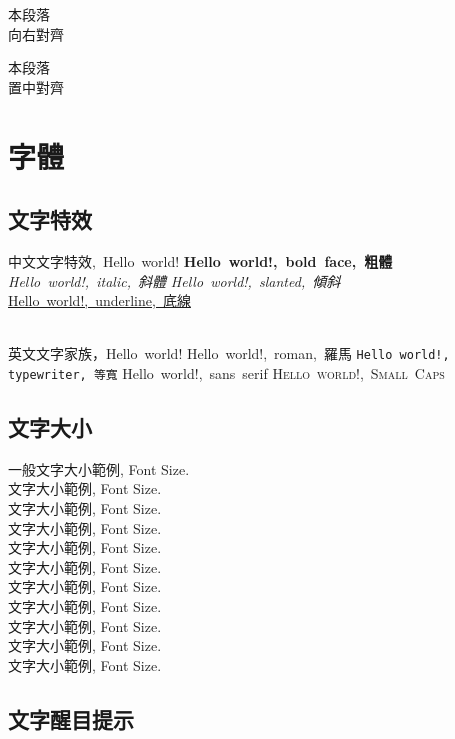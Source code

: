 \begin{flushright}
    本段落\\
    向右對齊
\end{flushright}

\begin{center}
    本段落\\
    置中對齊
\end{center}

\newpage

\section{字體}
\subsection{文字特效}

\hbox{中文文字特效, Hello world!}
{\LARGE
\hbox{\textbf{Hello world!, bold face, 粗體}}
\hbox{\textit{Hello world!, italic, 斜體}}
\hbox{\textsl{Hello world!, slanted, 傾斜}}
\hbox{\underline{Hello world!, underline, 底線}}
}

~\\

\hbox{英文文字家族，Hello world!}
{\LARGE
   \hbox{\textrm{Hello world!, roman, 羅馬}}
   \hbox{\texttt{Hello world!, typewriter, 等寬}}
   \hbox{\textsf{Hello world!, sans serif}}
   \hbox{\textsc{Hello world!, Small Caps}}
}
\clearpage

\subsection{文字大小}
一般文字大小範例, Font Size. \\
{\tiny 文字大小範例, Font Size.} \\
{\scriptsize 文字大小範例, Font Size.} \\
{\footnotesize 文字大小範例, Font Size.} \\
{\small 文字大小範例, Font Size.} \\
{\normalsize 文字大小範例, Font Size.} \\
{\large 文字大小範例, Font Size.} \\
{\Large 文字大小範例, Font Size.} \\
{\LARGE 文字大小範例, Font Size.} \\
{\huge 文字大小範例, Font Size.} \\
{\Huge 文字大小範例, Font Size.}
\clearpage

\subsection{文字醒目提示}

